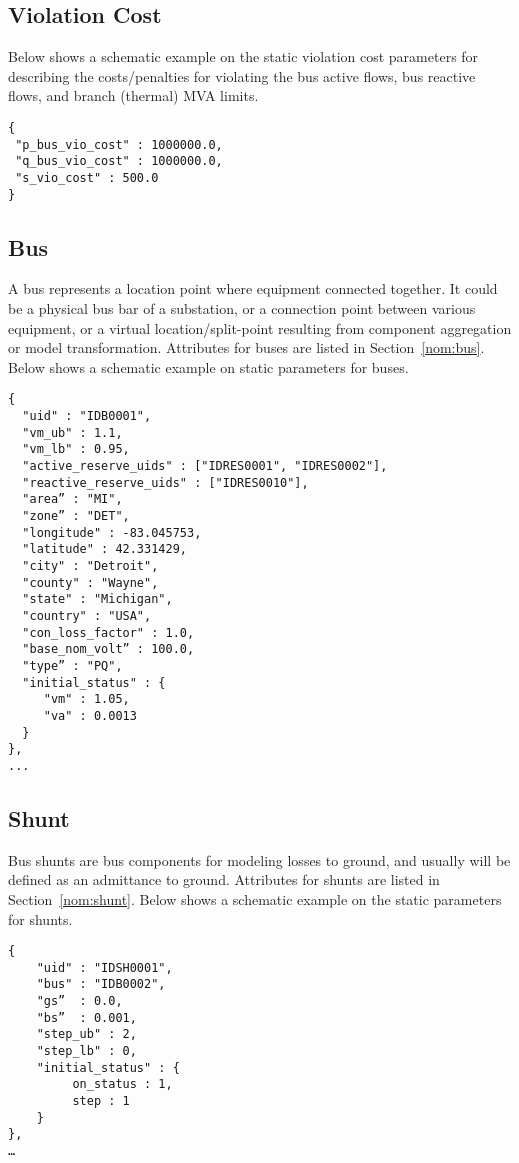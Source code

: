 \subsection{Violation Cost}
\label{sec:violation}
Below shows a schematic example on the static violation cost parameters for 
describing the costs/penalties for violating the bus active flows, bus reactive flows, 
and branch (thermal) MVA limits. 

\begin{verbatim}
{
 "p_bus_vio_cost" : 1000000.0,
 "q_bus_vio_cost" : 1000000.0,
 "s_vio_cost" : 500.0
}
\end{verbatim}


\subsection{Bus}
\label{sec:bus}
A bus represents a location point where equipment connected together.
It could be a physical bus bar of a substation, or 
a connection point between various equipment, 
or a virtual location/split-point resulting from
component aggregation or model transformation.
Attributes for buses are listed in Section~\ref{nom:bus}.
Below shows a schematic example on static parameters for buses.
\begin{verbatim}
{
  "uid" : "IDB0001",
  "vm_ub" : 1.1,
  "vm_lb" : 0.95,
  "active_reserve_uids" : ["IDRES0001", "IDRES0002"],
  "reactive_reserve_uids" : ["IDRES0010"],
  "area” : "MI",
  "zone” : "DET",
  "longitude" : -83.045753,
  "latitude" : 42.331429,
  "city" : "Detroit",
  "county" : "Wayne",
  "state" : "Michigan",
  "country" : "USA",
  "con_loss_factor" : 1.0,
  "base_nom_volt” : 100.0,
  "type” : "PQ",
  "initial_status" : {
     "vm" : 1.05,
     "va" : 0.0013
  }
},
...
\end{verbatim}


\subsection{Shunt}
\label{sec:shunt}
Bus shunts are bus components for modeling losses to ground, and 
usually will be defined as an admittance to ground.
Attributes for shunts are listed in Section~\ref{nom:shunt}.
Below shows a schematic example on the static parameters for shunts.
\begin{verbatim}
{
    "uid" : "IDSH0001",
    "bus" : "IDB0002",
    "gs”  : 0.0,
    "bs”  : 0.001,
    "step_ub" : 2,
    "step_lb" : 0,
    "initial_status" : {
         on_status : 1,
         step : 1
    }
},
…    
\end{verbatim}


